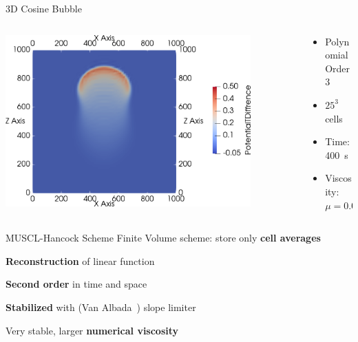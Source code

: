 \documentclass[aspectratio=169]{beamer}
\begin{document}
\begin{frame}{3D Cosine Bubble}
  \begin{columns}
    \begin{column}{0.6\textwidth}
  \begin{center}
    \includegraphics[width=0.85\textwidth]{ppam_cosine_bubble_3d}
  \end{center}
    \end{column}
    \begin{column}{0.4\textwidth}
      \begin{itemize}
      \item Polynomial Order 3
      \item $25^3$ cells
      \item Time: \SI{400}{\s}
      \item Viscosity: $\mu = 0.05$
      \end{itemize}
    \end{column}

  \end{columns}
\end{frame}


\begin{frame}{MUSCL-Hancock Scheme}
  Finite Volume scheme: store only \textbf{cell averages}

  \textbf{Reconstruction} of linear function

  \textbf{Second order} in time and space

  \textbf{Stabilized} with (Van Albada~) slope limiter

  Very stable, larger \textbf{numerical viscosity}
\end{frame}
\end{document}
